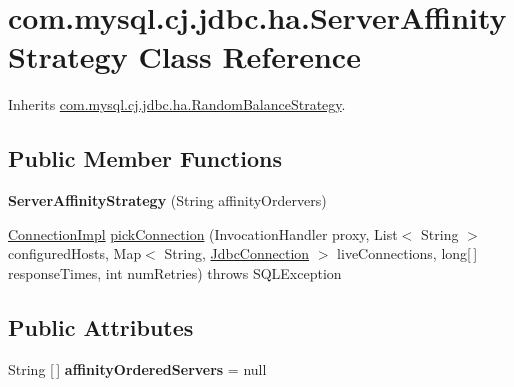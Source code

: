 \hypertarget{classcom_1_1mysql_1_1cj_1_1jdbc_1_1ha_1_1_server_affinity_strategy}{}\section{com.\+mysql.\+cj.\+jdbc.\+ha.\+Server\+Affinity\+Strategy Class Reference}
\label{classcom_1_1mysql_1_1cj_1_1jdbc_1_1ha_1_1_server_affinity_strategy}


Inherits \mbox{\hyperlink{classcom_1_1mysql_1_1cj_1_1jdbc_1_1ha_1_1_random_balance_strategy}{com.\+mysql.\+cj.\+jdbc.\+ha.\+Random\+Balance\+Strategy}}.

\subsection*{Public Member Functions}
\begin{DoxyCompactItemize}
\item 
\mbox{\label{classcom_1_1mysql_1_1cj_1_1jdbc_1_1ha_1_1_server_affinity_strategy_a084e3a46f4b73b2407e65fecc82999c1}} 
{\bfseries Server\+Affinity\+Strategy} (String affinity\+Ordervers)
\item 
\mbox{\hyperlink{classcom_1_1mysql_1_1cj_1_1jdbc_1_1_connection_impl}{Connection\+Impl}} \mbox{\hyperlink{classcom_1_1mysql_1_1cj_1_1jdbc_1_1ha_1_1_server_affinity_strategy_adea6043b91b0a489e31de053e0f4cd25}{pick\+Connection}} (Invocation\+Handler proxy, List$<$ String $>$ configured\+Hosts, Map$<$ String, \mbox{\hyperlink{interfacecom_1_1mysql_1_1cj_1_1jdbc_1_1_jdbc_connection}{Jdbc\+Connection}} $>$ live\+Connections, long\mbox{[}$\,$\mbox{]} response\+Times, int num\+Retries)  throws S\+Q\+L\+Exception 
\end{DoxyCompactItemize}
\subsection*{Public Attributes}
\begin{DoxyCompactItemize}
\item 
\mbox{\label{classcom_1_1mysql_1_1cj_1_1jdbc_1_1ha_1_1_server_affinity_strategy_a96c78033614870596e5cac05d283ff84}} 
String \mbox{[}$\,$\mbox{]} {\bfseries affinity\+Ordered\+Servers} = null
\end{DoxyCompactItemize}


